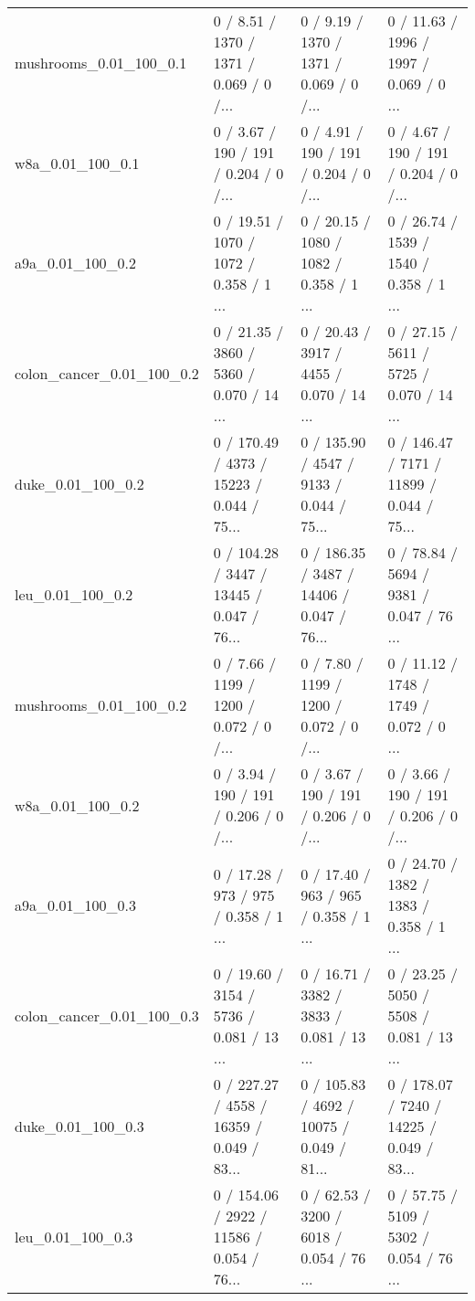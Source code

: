 \begin{tabular}{llll}
    mushrooms\_0.01\_100\_0.1 &  0 / 8.51 /   1370 /    1371 / 0.069 /      0 /... &  0 / 9.19 /   1370 /    1371 / 0.069 /      0 /... &  0 / 11.63 /   1996 /    1997 / 0.069 /      0 ... \\
          w8a\_0.01\_100\_0.1 &  0 / 3.67 /    190 /     191 / 0.204 /      0 /... &  0 / 4.91 /    190 /     191 / 0.204 /      0 /... &  0 / 4.67 /    190 /     191 / 0.204 /      0 /... \\
          a9a\_0.01\_100\_0.2 &  0 / 19.51 /   1070 /    1072 / 0.358 /      1 ... &  0 / 20.15 /   1080 /    1082 / 0.358 /      1 ... &  0 / 26.74 /   1539 /    1540 / 0.358 /      1 ... \\
 colon\_cancer\_0.01\_100\_0.2 &  0 / 21.35 /   3860 /    5360 / 0.070 /     14 ... &  0 / 20.43 /   3917 /    4455 / 0.070 /     14 ... &  0 / 27.15 /   5611 /    5725 / 0.070 /     14 ... \\
         duke\_0.01\_100\_0.2 &  0 / 170.49 /   4373 /   15223 / 0.044 /     75... &  0 / 135.90 /   4547 /    9133 / 0.044 /     75... &  0 / 146.47 /   7171 /   11899 / 0.044 /     75... \\
          leu\_0.01\_100\_0.2 &  0 / 104.28 /   3447 /   13445 / 0.047 /     76... &  0 / 186.35 /   3487 /   14406 / 0.047 /     76... &  0 / 78.84 /   5694 /    9381 / 0.047 /     76 ... \\
    mushrooms\_0.01\_100\_0.2 &  0 / 7.66 /   1199 /    1200 / 0.072 /      0 /... &  0 / 7.80 /   1199 /    1200 / 0.072 /      0 /... &  0 / 11.12 /   1748 /    1749 / 0.072 /      0 ... \\
          w8a\_0.01\_100\_0.2 &  0 / 3.94 /    190 /     191 / 0.206 /      0 /... &  0 / 3.67 /    190 /     191 / 0.206 /      0 /... &  0 / 3.66 /    190 /     191 / 0.206 /      0 /... \\
          a9a\_0.01\_100\_0.3 &  0 / 17.28 /    973 /     975 / 0.358 /      1 ... &  0 / 17.40 /    963 /     965 / 0.358 /      1 ... &  0 / 24.70 /   1382 /    1383 / 0.358 /      1 ... \\
 colon\_cancer\_0.01\_100\_0.3 &  0 / 19.60 /   3154 /    5736 / 0.081 /     13 ... &  0 / 16.71 /   3382 /    3833 / 0.081 /     13 ... &  0 / 23.25 /   5050 /    5508 / 0.081 /     13 ... \\
         duke\_0.01\_100\_0.3 &  0 / 227.27 /   4558 /   16359 / 0.049 /     83... &  0 / 105.83 /   4692 /   10075 / 0.049 /     81... &  0 / 178.07 /   7240 /   14225 / 0.049 /     83... \\
          leu\_0.01\_100\_0.3 &  0 / 154.06 /   2922 /   11586 / 0.054 /     76... &  0 / 62.53 /   3200 /    6018 / 0.054 /     76 ... &  0 / 57.75 /   5109 /    5302 / 0.054 /     76 ... \\

\end{tabular}
